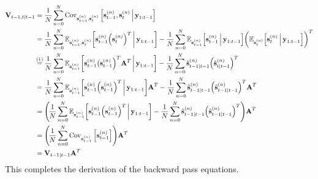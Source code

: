 		\begin{align*}
			\mat{V}_{t - 1, t \subgiven t - 1}
				&= \frac{1}{N} \sum_{n = 0}^{N} \Cov_{\vec{s}_{t - 1}^{(n)}, \vec{s}_t^{(n)}}\Big[\vec{s}_{t - 1}^{(n)}, \vec{s}_t^{(n)} \Biggiven \vec{y}_{1:t - 1}\Big] \\
				&= \frac{1}{N} \sum_{n = 0}^{N} \E_{\vec{s}_{t - 1}^{(n)}, \vec{s}_t^{(n)}}\bigg[\vec{s}_{t - 1}^{(n)} \Big(\vec{s}_t^{(n)}\Big)^T \bigggiven \vec{y}_{1:t - 1}\bigg] - \frac{1}{N} \sum_{n = 0}^{N} \E_{\vec{s}_{t - 1}^{(n)}}\Big[\vec{s}_{t - 1}^{(n)} \Biggiven \vec{y}_{1:t - 1}\Big] \bigg( \E_{\vec{s}_t^{(n)}}\Big[\vec{s}_t^{(n)} \Biggiven \vec{y}_{1:t - 1}\Big] \bigg)^T \\
				&\oversetfootnotemark{=} \frac{1}{N} \sum_{n = 0}^{N} \E_{\vec{s}_{t - 1}^{(n)}}\bigg[\vec{s}_{t - 1}^{(n)} \big(\vec{s}_{t - 1}^{(n)}\Big)^T \mat{A}^T \bigggiven \vec{y}_{1:t - 1}\bigg] - \frac{1}{N} \sum_{n = 0}^{N} \hat{\vec{s}}_{t - 1 \subgiven t - 1}^{(n)} \Big(\hat{\vec{s}}_{t \subgiven t - 1}^{(n)}\Big)^T \\
				&= \frac{1}{N} \sum_{n = 0}^{N} \E_{\vec{s}_{t - 1}^{(n)}}\bigg[\vec{s}_{t - 1}^{(n)} \Big(\vec{s}_{t - 1}^{(n)}\Big)^T \bigggiven \vec{y}_{1:t - 1}\bigg] \mat{A}^T - \frac{1}{N} \sum_{n = 0}^{N} \hat{\vec{s}}_{t - 1 \subgiven t - 1}^{(n)} \Big( \hat{\vec{s}}_{t - 1 \subgiven t - 1}^{(n)} \Big)^T \mat{A}^T \\
				&= \Bigg(\! \frac{1}{N} \sum_{n = 0}^{N} \E_{\vec{s}_{t - 1}^{(n)}}\bigg[\vec{s}_{t - 1}^{(n)} \Big(\vec{s}_{t - 1}^{(n)}\Big)^T \bigggiven \vec{y}_{1:t - 1}\bigg] - \frac{1}{N} \sum_{n = 0}^{N} \hat{\vec{s}}_{t - 1 \subgiven t - 1}^{(n)} \Big( \hat{\vec{s}}_{t - 1 \subgiven t - 1}^{(n)} \Big)^T \Bigg) \mat{A}^T \\
				&= \Bigg(\! \frac{1}{N} \sum_{n = 0}^{N} \Cov_{\vec{s}_{t - 1}^{(n)}}\Big[\vec{s}_{t - 1}^{(n)}\Big] \Bigg) \mat{A}^T \\
				&= \mat{V}_{t - 1 \subgiven t - 1} \mat{A}^T
		\end{align*}
		This completes the derivation of the backward pass equations.

